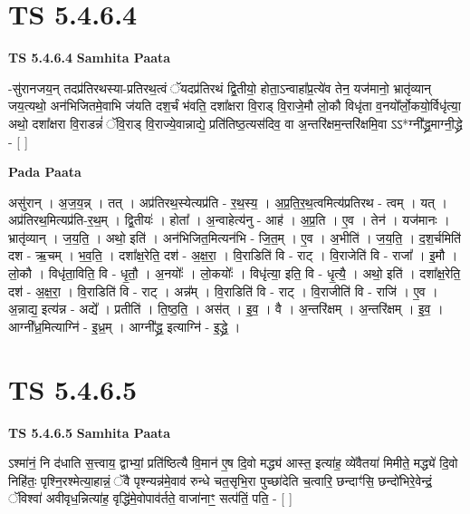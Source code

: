 \documentclass[17pt]{extarticle}
\begin{document}
\section*{ TS 5.4.6.4 }

\textbf{TS 5.4.6.4 } \newline
\textbf{Samhita Paata} \newline

-सु॑रानजय॒न् तदप्र॑तिरथस्या-प्रतिरथ॒त्वं ॅयदप्र॑तिरथं द्वि॒तीयो॒ होता॒ऽन्वाहा᳚प्र॒त्ये॑व तेन॒ यज॑मानो॒ भ्रातृ॑व्यान् जय॒त्यथो॒ अन॑भिजितमे॒वाभि ज॑यति दश॒र्चं भ॑वति॒ दशा᳚क्षरा वि॒राड् वि॒राजे॒मौ लो॒कौ विधृ॑ता व॒नयो᳚र्लो॒कयो॒र्विधृ॑त्या॒ अथो॒ दशा᳚क्षरा वि॒राडन्नं॑ ॅवि॒राड् वि॒राज्ये॒वान्नाद्ये॒ प्रति॑तिष्ठ॒त्यस॑दिव॒ वा अ॒न्तरि॑क्षम॒न्तरि॑क्षमि॒वा ऽऽ*ग्नी᳚द्ध्र॒माग्नी॒द्ध्रे - [  ] \newline

\textbf{Pada Paata} \newline

असु॑रान् । अ॒ज॒य॒न्न् । तत् । अप्र॑तिरथ॒स्येत्यप्र॑ति - र॒थ॒स्य॒ । अ॒प्र॒ति॒र॒थ॒त्वमित्य॑प्रतिरथ - त्वम् । यत् । अप्र॑तिरथ॒मित्यप्र॑ति-र॒थ॒म् । द्वि॒तीयः॑ । होता᳚ । अ॒न्वाहेत्य॑नु - आह॑ । अ॒प्र॒ति । ए॒व । तेन॑ । यज॑मानः । भ्रातृ॑व्यान् । ज॒य॒ति॒ । अथो॒ इति॑ । अन॑भिजित॒मित्यन॑भि - जि॒त॒म् । ए॒व । अ॒भीति॑ । ज॒य॒ति॒ । द॒श॒र्चमिति॑ दश - ऋ॒चम् । भ॒व॒ति॒ । दशा᳚क्ष॒रेति॒ दश॑ - अ॒क्ष॒रा॒ । वि॒राडिति॑ वि - राट् । वि॒राजेति॑ वि - राजा᳚ । इ॒मौ । लो॒कौ । विधृ॑ता॒विति॒ वि - धृ॒तौ॒ । अ॒नयोः᳚ । लो॒कयोः᳚ । विधृ॑त्या॒ इति॒ वि - धृ॒त्यै॒ । अथो॒ इति॑ । दशा᳚क्ष॒रेति॒ दश॑ - अ॒क्ष॒रा॒ । वि॒राडिति॑ वि - राट् । अन्न᳚म् । वि॒राडिति॑ वि - राट् । वि॒राजीति॑ वि - राजि॑ । ए॒व । अ॒न्नाद्य॒ इत्य॑न्न - अद्ये᳚ । प्रतीति॑ । ति॒ष्ठ॒ति॒ । अस॑त् । इ॒व॒ । वै । अ॒न्तरि॑क्षम् । अ॒न्तरि॑क्षम् । इ॒व॒ । आग्नी᳚ध्र॒मित्याग्नि॑ - इ॒ध्र॒म् । आग्नी᳚द्ध्र॒ इत्याग्नि॑ - इ॒द्ध्रे॒ ।  \newline




\section*{ TS 5.4.6.5 }

\textbf{TS 5.4.6.5 } \newline
\textbf{Samhita Paata} \newline

ऽश्मा॑नं॒ नि द॑धाति स॒त्त्वाय॒ द्वाभ्यां॒ प्रति॑ष्ठित्यै वि॒मान॑ ए॒ष दि॒वो मद्ध्य॑ आस्त॒ इत्या॑ह॒ व्ये॑वैतया॑ मिमीते॒ मद्ध्ये॑ दि॒वो निहि॑तः॒ पृश्नि॒रश्मेत्या॒हान्नं॒ ॅवै पृश्न्यन्न॑मे॒वाव॑ रुन्धे चत॒सृभि॒रा पुच्छा॑देति च॒त्वारि॒ छन्दाꣳ॑सि॒ छन्दो॑भिरे॒वेन्द्रं॒ ॅविश्वा॑ अवीवृध॒न्नित्या॑ह॒ वृद्धि॑मे॒वोपाव॑र्तते॒ वाजा॑नाꣳ॒॒ सत्प॑तिं॒ पति॒ - [  ] \newline
\end{document}
